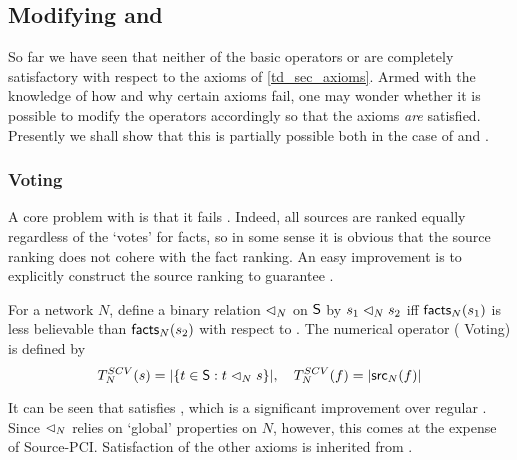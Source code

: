 \subsection{Modifying \voting{} and \sums{}}
\label{td_sec_modifying_voting_and_sums}

So far we have seen that neither of the basic operators \voting{} or \sums{}
are completely satisfactory with respect to the axioms of \cref{td_sec_axioms}.
Armed with the knowledge of how and why certain axioms fail, one may wonder
whether it is possible to modify the operators accordingly so that the axioms
\emph{are} satisfied. Presently we shall show that this is partially possible
both in the case of \voting{} and \sums{}.

\subsubsection{Voting}

A core problem with \voting{} is that it fails \coherence{}. Indeed, all sources
are ranked equally regardless of the `votes' for facts, so in some sense it is
obvious that the source ranking does not cohere with the fact
ranking.\footnotemark{} An easy improvement is to explicitly construct the
source ranking to guarantee \sourcecoherence{}.



\begin{definition}
For a network $N$, define a binary relation $\scoh_N$ on $\S$ by $s_1
\scoh_N s_2$ iff $\facts_N(s_1)$ is less believable than
$\facts_N(s_2)$ with respect to \voting{}. The numerical operator \scvoting{}
    (\sourcecoherence{} Voting) is defined by
\[
    T_N^{SCV}(s) = |\{t \in \S : t \scoh_N s \}|,
    \quad
    T_N^{SCV}(f) = |\src_N(f)|
\]
\end{definition}

It can be seen that \scvoting{} satisfies \sourcecoherence{}, which is a
significant improvement over regular \voting{}. Since $\scoh_N$ relies on
`global' properties on $N$, however, this comes at the expense of Source-PCI.
Satisfaction of the other axioms is inherited from \voting{}.

